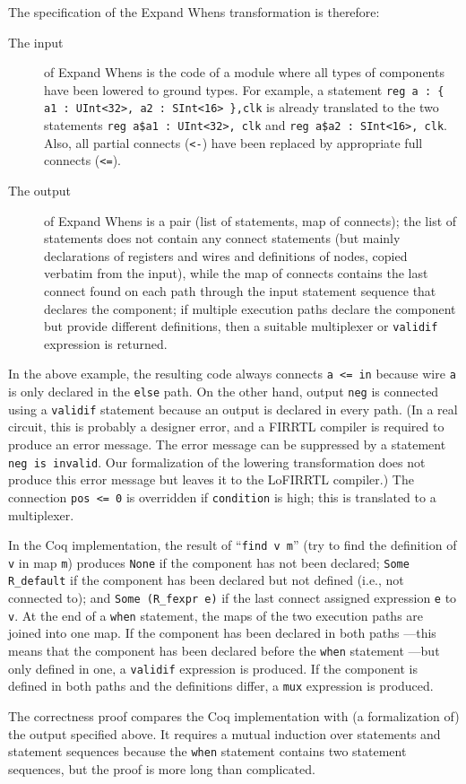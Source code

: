 The specification of the Expand Whens transformation is therefore:
\begin{description}
\item[The input] of Expand Whens is the code of a module
where all types of components have been lowered to ground types.
For example, a statement \lstinline!reg a : { a1 : UInt<32>, a2 : SInt<16> },clk!
is already translated to the two statements
\lstinline!reg a$a1 : UInt<32>, clk! and
\lstinline!reg a$a2 : SInt<16>, clk!.
Also, all partial connects (\lstinline!<-!) have been replaced by appropriate full connects (\lstinline!<=!).

\item[The output] of Expand Whens is a pair (list of statements, map of connects);
the list of statements does not contain any connect statements
(but mainly declarations of registers and wires and definitions of nodes,
copied verbatim from the input),
while the map of connects contains
the last connect found on each path through the input statement sequence that declares the component;
if multiple execution paths declare the component but provide different definitions,
then a suitable multiplexer or \lstinline!validif! expression is returned.
\end{description}

In the above example, the resulting code always connects \lstinline!a <= in!
because wire \lstinline!a! is only declared in the \lstinline!else! path.
On the other hand, output \lstinline!neg! is connected using a \lstinline!validif! statement
because an output is declared in every path.
(In a real circuit, this is probably a designer error,
and a FIRRTL compiler is required to produce an error message.
The error message can be suppressed by a statement \lstinline!neg is invalid!.
Our formalization of the lowering transformation does not produce this error message
but leaves it to the LoFIRRTL compiler.)
The connection \lstinline~pos <= 0~ is overridden if \lstinline~condition~ is high;
this is translated to a multiplexer.

In the Coq implementation, the result of ``\texttt{find v m}'' (try to find the definition of \texttt{v} in map \texttt{m})
produces \texttt{None} if the component has not been declared;
\texttt{Some R\_default} if the component has been declared but not defined
(i.e.\@, not connected to);
and \texttt{Some (R\_fexpr e)} if the last connect assigned expression \texttt{e} to \texttt{v}.
At the end of a \lstinline!when! statement,
the maps of the two execution paths are joined into one map.
If the component has been declared in both paths%
---this means that the component has been declared before the \lstinline~when~ statement%
---but only defined in one, a \lstinline!validif! expression is produced.
If the component is defined in both paths
and the definitions differ, a \lstinline!mux! expression is produced.

The correctness proof compares the Coq implementation with (a formalization of) the output specified above.
It requires a mutual induction over statements and statement sequences
because the \lstinline~when~ statement contains two statement sequences,
but the proof is more long than complicated.
